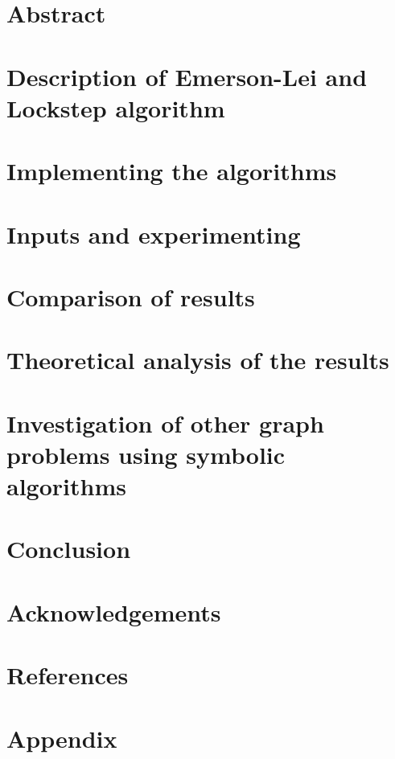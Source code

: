 \documentclass[a4, english]{article}
\title{\titlecontent}
\author{Magdalena Kalin-Czerska}
\author{Jonathan Eilath }
\author{Mikael Bisgaard Dahlsen-Jensen}
\affil{Aarhus University}
\begin{document}
 \pagestyle{empty}

\maketitle

\newpage

\section{Abstract}

\section{Description of Emerson-Lei and Lockstep algorithm}

\section{Implementing the algorithms}

\section{Inputs and experimenting}

\section{Comparison of results}

\section{Theoretical analysis of the results}

\section{Investigation of other graph problems using symbolic algorithms}

\section{Conclusion}

\section{Acknowledgements}

\section{References}

\section{Appendix}
\end{document}
